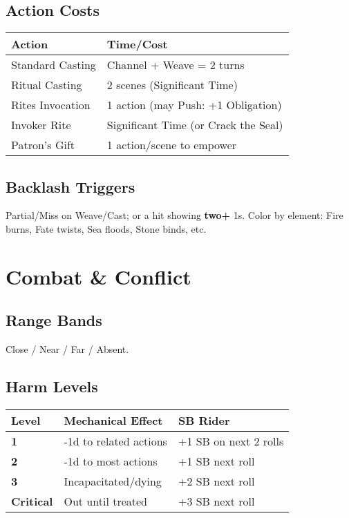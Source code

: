 \begin{multicols}{2}
\subsection*{Action Costs}
\begin{center}
\begin{tabular}{ll}
\toprule
\textbf{Action} & \textbf{Time/Cost} \\
\midrule
Standard Casting & Channel + Weave = 2 turns \\
Ritual Casting & 2 scenes (Significant Time) \\
Rites Invocation & 1 action (may Push: +1 Obligation) \\
Invoker Rite & Significant Time (or Crack the Seal) \\
Patron’s Gift & 1 action/scene to empower \\
\bottomrule
\end{tabular}
\end{center}

\subsection*{Backlash Triggers}
Partial/Miss on Weave/Cast; or a hit showing \textbf{two+} 1s. Color by element: Fire burns, Fate twists, Sea floods, Stone binds, etc.

\section{Combat \& Conflict}

\subsection*{Range Bands}
Close / Near / Far / Absent.

\subsection*{Harm Levels}
\begin{center}
\begin{tabular}{lll}
\toprule
\textbf{Level} & \textbf{Mechanical Effect} & \textbf{SB Rider} \\
\midrule
\textbf{1} & -1d to related actions & +1 SB on next 2 rolls \\
\textbf{2} & -1d to most actions & +1 SB next roll \\
\textbf{3} & Incapacitated/dying & +2 SB next roll \\
\textbf{Critical} & Out until treated & +3 SB next roll \\
\bottomrule
\end{tabular}
\end{center}


\end{multicols}
